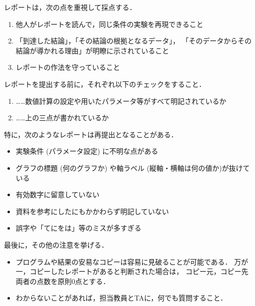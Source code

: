 \documentclass[10pt,a4paper,dvipdfmx]{jsarticle}%
\begin{document}
レポートは，次の点を重視して採点する．
\begin{enumerate}
	\item 他人がレポートを読んで，同じ条件の実験を再現できること
	\item 「到達した結論」，「その結論の根拠となるデータ」，
			「そのデータからその結論が導かれる理由」が明瞭に示されていること
	\item レポートの作法を守っていること
\end{enumerate}
レポートを提出する前に，それぞれ以下のチェックをすること．
\begin{enumerate}
	\item ……数値計算の設定や用いたパラメータ等がすべて明記されているか
	\item ……上の三点が書かれているか
\end{enumerate}
特に，次のようなレポートは再提出となることがある．
\begin{itemize}
	\item 実験条件 (パラメータ設定) に不明な点がある
	\item グラフの標題 (何のグラフか) や軸ラベル (縦軸・横軸は何の値か)が抜けている
	\item 有効数字に留意していない
	\item 資料を参考にしたにもかかわらず明記していない
	\item 誤字や「てにをは」等のミスが多すぎる
\end{itemize}
%
最後に，その他の注意を挙げる．
\begin{itemize}
	\item プログラムや結果の安易なコピーは容易に見破ることが可能である．
		万が一，コピーしたレポートがあると判断された場合は，
		コピー元，コピー先両者の点数を原則0点とする．

	\item わからないことがあれば，担当教員とTAに，何でも質問すること．

			 
\end{itemize}
\end{document}
